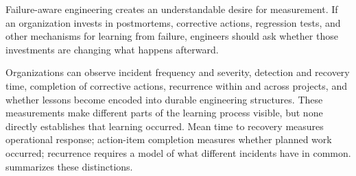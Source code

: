 Failure-aware engineering creates an understandable desire for measurement. If an organization
invests in postmortems, corrective actions, regression tests, and other mechanisms for learning
from failure, engineers should ask whether those investments are changing what happens afterward.

Organizations can observe incident frequency and severity, detection and recovery time, completion
of corrective actions, recurrence within and across projects, and whether lessons become encoded
into durable engineering structures. These measurements make different parts of the learning
process visible, but none directly establishes that learning occurred. Mean time to recovery
measures operational response; action-item completion measures whether planned work occurred;
recurrence requires a model of what different incidents have in common. \citet{tbl-learning-observables}
summarizes these distinctions.

